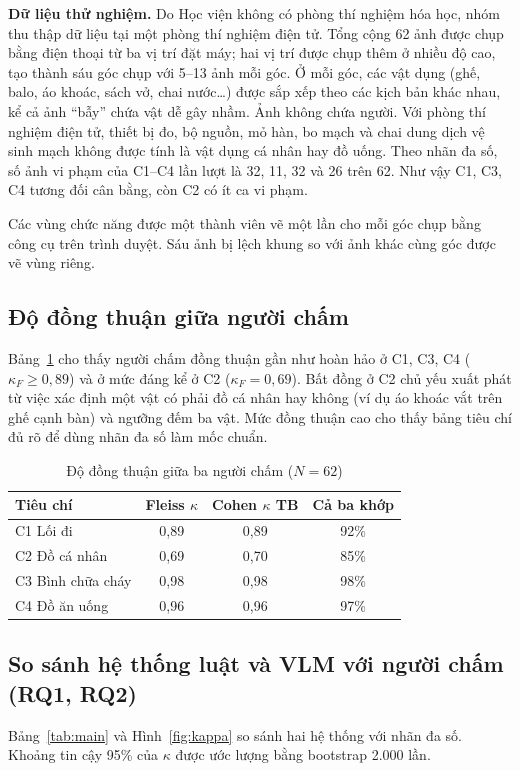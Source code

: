 \documentclass[conference]{IEEEtran}
\begin{document}
\textbf{Dữ liệu thử nghiệm.} Do Học viện không có phòng thí nghiệm hóa học, nhóm thu thập dữ liệu tại một phòng thí nghiệm điện tử. Tổng cộng 62 ảnh được chụp bằng điện thoại từ ba vị trí đặt máy; hai vị trí được chụp thêm ở nhiều độ cao, tạo thành sáu góc chụp với 5--13 ảnh mỗi góc. Ở mỗi góc, các vật dụng (ghế, balo, áo khoác, sách vở, chai nước\ldots) được sắp xếp theo các kịch bản khác nhau, kể cả ảnh ``bẫy'' chứa vật dễ gây nhầm. Ảnh không chứa người. Với phòng thí nghiệm điện tử, thiết bị đo, bộ nguồn, mỏ hàn, bo mạch và chai dung dịch vệ sinh mạch không được tính là vật dụng cá nhân hay đồ uống. Theo nhãn đa số, số ảnh vi phạm của C1--C4 lần lượt là 32, 11, 32 và 26 trên 62. Như vậy C1, C3, C4 tương đối cân bằng, còn C2 có ít ca vi phạm.

Các vùng chức năng được một thành viên vẽ một lần cho mỗi góc chụp bằng công cụ trên trình duyệt. Sáu ảnh bị lệch khung so với ảnh khác cùng góc được vẽ vùng riêng.

\subsection{Độ đồng thuận giữa người chấm}
Bảng~\ref{tab:inter} cho thấy người chấm đồng thuận gần như hoàn hảo ở C1, C3, C4 ($\kappa_F \ge 0{,}89$) và ở mức đáng kể ở C2 ($\kappa_F = 0{,}69$). Bất đồng ở C2 chủ yếu xuất phát từ việc xác định một vật có phải đồ cá nhân hay không (ví dụ áo khoác vắt trên ghế cạnh bàn) và ngưỡng đếm ba vật. Mức đồng thuận cao cho thấy bảng tiêu chí đủ rõ để dùng nhãn đa số làm mốc chuẩn.

\begin{table}[t]
\centering
\caption{Độ đồng thuận giữa ba người chấm ($N = 62$)}
\label{tab:inter}
\footnotesize
\begin{tabular}{lccc}
\toprule
Tiêu chí & Fleiss $\kappa$ & Cohen $\kappa$ TB & Cả ba khớp \\
\midrule
C1 Lối đi & 0{,}89 & 0{,}89 & 92\% \\
C2 Đồ cá nhân & 0{,}69 & 0{,}70 & 85\% \\
C3 Bình chữa cháy & 0{,}98 & 0{,}98 & 98\% \\
C4 Đồ ăn uống & 0{,}96 & 0{,}96 & 97\% \\
\bottomrule
\end{tabular}
\end{table}

\subsection{So sánh hệ thống luật và VLM với người chấm (RQ1, RQ2)}
Bảng~\ref{tab:main} và Hình~\ref{fig:kappa} so sánh hai hệ thống với nhãn đa số. Khoảng tin cậy 95\% của $\kappa$ được ước lượng bằng bootstrap 2.000 lần.
\end{document}
